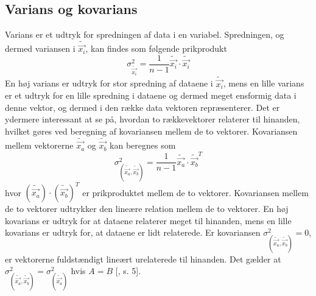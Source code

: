 \subsection{Varians og kovarians}\label{sec:varians}
Varians er et udtryk for spredningen af data i en variabel. Spredningen, og dermed variansen i $\tilde{\vec{x_i}}$, kan findes som følgende prikprodukt
\begin{equation}
\sigma^2_{\tilde{\vec{x_i}}}= \frac{1}{n - 1}\tilde{\vec{x_i}} \cdot \tilde{\vec{x_i}}
\label{eq:varians}
\end{equation}
En høj varians er udtryk for stor spredning af dataene i $\tilde{\vec{x_i}}$, mens en lille varians er et udtryk for en lille spredning i dataene og dermed meget ensformig data i denne vektor, og dermed i den række data vektoren repræsenterer.
Det er ydermere interessant at se på, hvordan to rækkevektorer relaterer til hinanden, hvilket gøres ved beregning af kovariansen mellem de to vektorer. Kovariansen mellem vektorerne $\tilde{\vec{x_a}}$ og $\tilde{\vec{x_b}}$ kan beregnes som \begin{equation}
\sigma^2_{(\tilde{\vec{x_a}},\tilde{\vec{x_b}})} = \frac{1}{n - 1} \tilde{\vec{x_a}} \cdot {\tilde{\vec{x_b}}}^T
\label{eq:covarians}
\end{equation}
hvor $(\tilde{\vec{x_a}}) \cdot (\tilde{\vec{x_b}})^T$ er prikproduktet mellem de to vektorer. Kovariansen mellem de to vektorer udtrykker den lineære relation mellem de to vektorer. En høj kovarians er udtryk for at dataene relaterer meget til hinanden, mens en lille kovarians er udtryk for, at dataene er lidt relaterede. Er kovariansen $\sigma^2_{(\tilde{\vec{x_a}},\tilde{\vec{x_b}})} = 0$, er vektorerne fuldstændigt lineært urelaterede til hinanden. Det gælder at $\sigma^2_{(\tilde{\vec{x_a}},\tilde{\vec{x_b}})}=\sigma^2_{(\tilde{\vec{x_a}})}$ hvis $A=B$ [\citet{PCA_slens}, s. 5].

